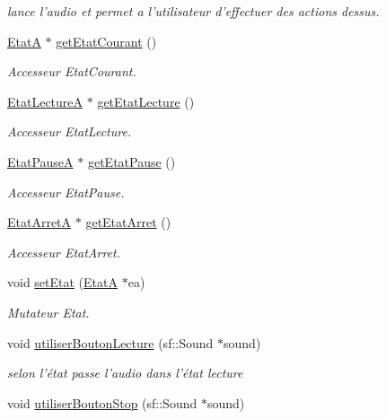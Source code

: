 \begin{DoxyCompactItemize}
\begin{DoxyCompactList}\small\item\em lance l'audio et permet a l'utilisateur d'effectuer des actions dessus. \end{DoxyCompactList}\item 
\hyperlink{classEtatA}{Etat\+A} $\ast$ \hyperlink{classAudio_abc78969597e0e29936687e5bd492afa5}{get\+Etat\+Courant} ()
\begin{DoxyCompactList}\small\item\em Accesseur Etat\+Courant. \end{DoxyCompactList}\item 
\hyperlink{classEtatLectureA}{Etat\+Lecture\+A} $\ast$ \hyperlink{classAudio_a18a93b2599ee62c410a14d24616aa7ea}{get\+Etat\+Lecture} ()
\begin{DoxyCompactList}\small\item\em Accesseur Etat\+Lecture. \end{DoxyCompactList}\item 
\hyperlink{classEtatPauseA}{Etat\+Pause\+A} $\ast$ \hyperlink{classAudio_acef026681c15335e45892950223f9f32}{get\+Etat\+Pause} ()
\begin{DoxyCompactList}\small\item\em Accesseur Etat\+Pause. \end{DoxyCompactList}\item 
\hyperlink{classEtatArretA}{Etat\+Arret\+A} $\ast$ \hyperlink{classAudio_a38d8b4444ff8a9ccf04a5d97e1690718}{get\+Etat\+Arret} ()
\begin{DoxyCompactList}\small\item\em Accesseur Etat\+Arret. \end{DoxyCompactList}\item 
void \hyperlink{classAudio_a8b51ce7751d78af0f73c561940ccb3be}{set\+Etat} (\hyperlink{classEtatA}{Etat\+A} $\ast$ea)
\begin{DoxyCompactList}\small\item\em Mutateur Etat. \end{DoxyCompactList}\item 
\hypertarget{classAudio_a78fc68f0aff8192938eb49edfaa0e003}{void \hyperlink{classAudio_a78fc68f0aff8192938eb49edfaa0e003}{utiliser\+Bouton\+Lecture} (sf\+::\+Sound $\ast$sound)}\label{classAudio_a78fc68f0aff8192938eb49edfaa0e003}

\begin{DoxyCompactList}\small\item\em selon l'état passe l'audio dans l'état lecture \end{DoxyCompactList}\item 
\hypertarget{classAudio_a33bb2b93eea04897c9640022a8267418}{void \hyperlink{classAudio_a33bb2b93eea04897c9640022a8267418}{utiliser\+Bouton\+Stop} (sf\+::\+Sound $\ast$sound)}\label{classAudio_a33bb2b93eea04897c9640022a8267418}


\end{DoxyCompactItemize}
